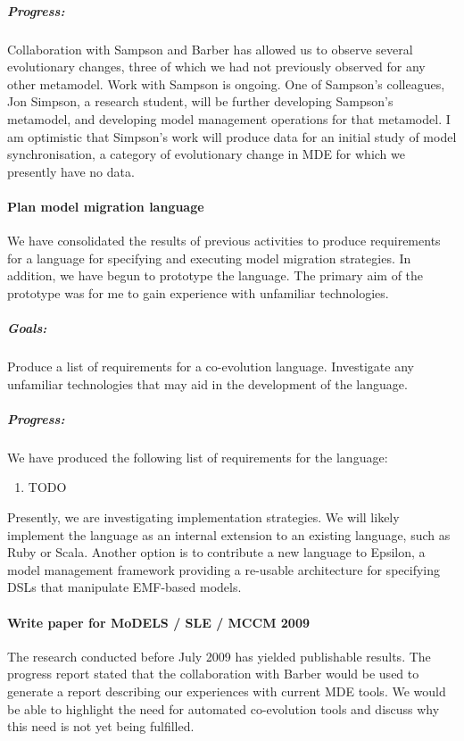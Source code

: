 \subparagraph{Progress:} Collaboration with Sampson and Barber has allowed us to observe several evolutionary changes, three of which we had not previously observed for any other metamodel. Work with Sampson is ongoing. One of Sampson's colleagues, Jon Simpson, a research student, will be further developing Sampson's metamodel, and developing model management operations for that metamodel. I am optimistic that Simpson's work will produce data for an initial study of model synchronisation, a category of evolutionary change in MDE for which we presently have no data.



\paragraph{Plan model migration language} %
\label{par:plan_metamodel_evolution_language}
We have consolidated the results of previous activities to produce requirements for a language for specifying and executing model migration strategies. In addition, we have begun to prototype the language. The primary aim of the prototype was for me to gain experience with unfamiliar technologies.

\subparagraph{Goals:} Produce a list of requirements for a co-evolution language. Investigate any unfamiliar technologies that may aid in the development of the language.

\subparagraph{Progress:} We have produced the following list of requirements for the language:

\begin{enumerate}
	\item TODO
\end{enumerate}

Presently, we are investigating implementation strategies. We will likely implement the language as an internal extension to an existing language, such as Ruby or Scala. Another option is to contribute a new language to Epsilon, a model management framework providing a re-usable architecture for specifying DSLs that manipulate EMF-based models.


\paragraph{Write paper for MoDELS / SLE / MCCM 2009} %
\label{par:write_paper_for_models_sle_mccm_2009}
The research conducted before July 2009 has yielded publishable results. The progress report stated that the collaboration with Barber would be used to generate a report describing our experiences with current MDE tools. We would be able to highlight the need for automated co-evolution tools and discuss why this need is not yet being fulfilled.

